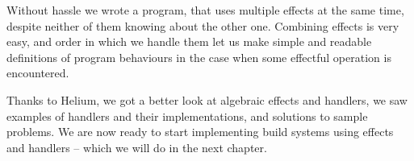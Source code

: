 

Without hassle we wrote a program, that uses multiple effects at the same time, despite neither of them knowing about the other one. Combining effects is very easy, and order in which we handle them let us make simple and readable definitions of program behaviours in the case when some effectful operation is encountered.

Thanks to Helium, we got a better look at algebraic effects and handlers, we saw examples of handlers and their implementations, and solutions to sample problems. We are now ready to start implementing build systems using effects and handlers -- which we will do in the next chapter.

\undef\inl
